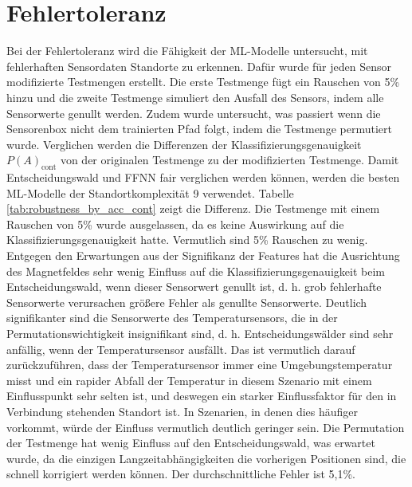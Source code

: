 \section{Fehlertoleranz}
Bei der Fehlertoleranz wird die Fähigkeit der ML-Modelle untersucht, mit fehlerhaften Sensordaten Standorte zu erkennen.
Dafür wurde für jeden Sensor modifizierte Testmengen erstellt.
Die erste Testmenge fügt ein Rauschen von 5\% hinzu und die zweite Testmenge simuliert den Ausfall des Sensors, indem alle Sensorwerte genullt werden.
Zudem wurde untersucht, was passiert wenn die Sensorenbox nicht dem trainierten Pfad folgt, indem die Testmenge permutiert wurde.
Verglichen werden die Differenzen der Klassifizierungsgenauigkeit $P(A)_{\text{cont}}$ von der originalen Testmenge zu der modifizierten Testmenge.
Damit Entscheidungswald und FFNN fair verglichen werden können, werden die besten ML-Modelle der Standortkomplexität 9 verwendet.
\newline
\newline
Tabelle \ref{tab:robustness_by_acc_cont} zeigt die Differenz.
Die Testmenge mit einem Rauschen von 5\% wurde ausgelassen, da es keine Auswirkung auf die Klassifizierungsgenauigkeit hatte.
Vermutlich sind 5\% Rauschen zu wenig.
Entgegen den Erwartungen aus der Signifikanz der Features hat die Ausrichtung des Magnetfeldes sehr wenig Einfluss auf die Klassifizierungsgenauigkeit beim Entscheidungswald,
wenn dieser Sensorwert genullt ist, d. h. grob fehlerhafte Sensorwerte verursachen größere Fehler als genullte Sensorwerte.
Deutlich signifikanter sind die Sensorwerte des Temperatursensors, die in der Permutationswichtigkeit insignifikant sind,
d. h. Entscheidungswälder sind sehr anfällig, wenn der Temperatursensor ausfällt.
Das ist vermutlich darauf zurückzuführen, dass der Temperatursensor immer eine Umgebungstemperatur misst und
ein rapider Abfall der Temperatur in diesem Szenario mit einem Einflusspunkt sehr selten ist, und deswegen ein
starker Einflussfaktor für den in Verbindung stehenden Standort ist.
In Szenarien, in denen dies häufiger vorkommt, würde der Einfluss vermutlich deutlich geringer sein.
Die Permutation der Testmenge hat wenig Einfluss auf den Entscheidungswald, was erwartet wurde,
da die einzigen Langzeitabhängigkeiten die vorherigen Positionen sind, die schnell korrigiert werden können.
Der durchschnittliche Fehler ist 5,1\%.
